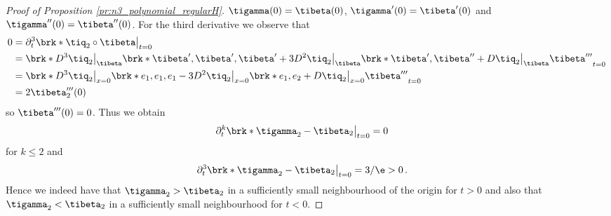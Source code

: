 \begin{proof}[Proof of Proposition \ref{pr:n3_polynomial_regularH}]
  $\tigamma(0)=\tibeta(0)$, $\tigamma'(0)=\tibeta'(0)$ and $\tigamma''(0)=\tibeta''(0)$.
  For the third derivative we observe that
  \begin{align*}
    0&=\partial_t^3\brk*{\tiq_2\circ\tibeta}\big\vert_{t=0} \\
    &=\brk*{D^3\tiq_2\big\vert_{\tibeta}\brk*{\tibeta',\tibeta',\tibeta'}
    +3D^2\tiq_2\big\vert_{\tibeta}\brk*{\tibeta',\tibeta''}
    +D\tiq_2\big\vert_{\tibeta}\tibeta'''}_{t=0} \\
    &=\brk*{D^3\tiq_2\big\vert_{x=0}\brk*{e_1,e_1,e_1}
    -3D^2\tiq_2\big\vert_{x=0}\brk*{e_1,e_2}
    +D\tiq_2\big\vert_{x=0}\tibeta'''}_{t=0} \\
    &=2\tibeta_2'''(0)
  \end{align*}
  so $\tibeta'''(0)=0$.
  Thus we obtain
  \begin{align*}
    \partial_t^k\brk*{\tigamma_2-\tibeta_2}\big\vert_{t=0}&=0 
  \end{align*}
  for $k\leq2$ and
  \begin{align*}
    \partial_t^3\brk*{\tigamma_2-\tibeta_2}\big\vert_{t=0}&=3/\e>0\,.
  \end{align*}
  Hence we indeed have that $\tigamma_2>\tibeta_2$ in a sufficiently small neighbourhood of the origin for $t>0$
  and also that  $\tigamma_2<\tibeta_2$ in a sufficiently small neighbourhood for $t<0$.


\end{proof}
